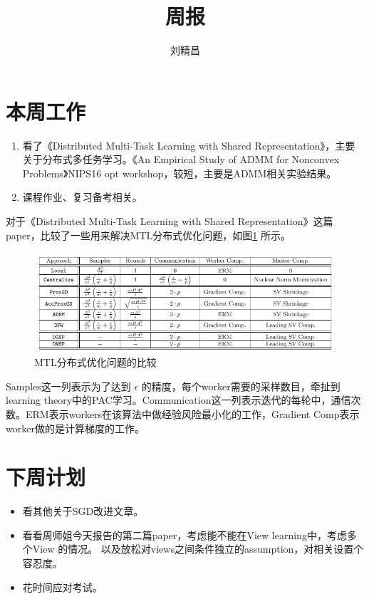 \documentclass{article}
\begin{document}
\title{周报}
\author{刘精昌}
\maketitle

\section*{本周工作}
\begin{enumerate}
  \item 看了《Distributed Multi-Task Learning with Shared Representation》，主要关于分布式多任务学习。《An Empirical Study of ADMM for Nonconvex Problems》NIPS16 opt workshop，较短，主要是ADMM相关实验结果。
  \item 课程作业、复习备考相关。
\end{enumerate}

对于《Distributed Multi-Task Learning with Shared Representation》这篇paper，比较了一些用来解决MTL分布式优化问题，如图\ref{1} 所示。
\begin{figure}
  \centering
  \includegraphics[width=\textwidth]{1.png}
  \caption{MTL分布式优化问题的比较}\label{1}
\end{figure}

Samples这一列表示为了达到 $\epsilon$ 的精度，每个worker需要的采样数目，牵扯到learning theory中的PAC学习。Communication这一列表示迭代的每轮中，通信次数。ERM表示workers在该算法中做经验风险最小化的工作，Gradient Comp表示worker做的是计算梯度的工作。

\section*{下周计划}
\begin{itemize}
    \item 看其他关于SGD改进文章。
    \item 看看周师姐今天报告的第二篇paper，考虑能不能在View learning中，考虑多个View 的情况。 以及放松对views之间条件独立的assumption，对相关设置个容忍度。
    \item 花时间应对考试。
\end{itemize}
\end{document}
